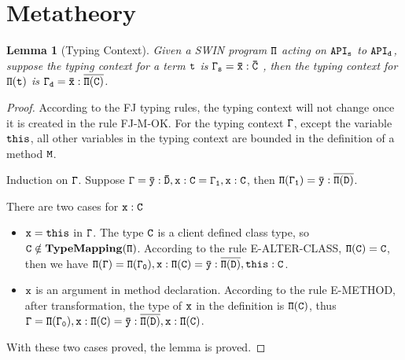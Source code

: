 \documentclass[letterpaper]{article}
\newtheorem{lemma}{Lemma}
\begin{document}
\section{Metatheory}
\begin{lemma}[Typing Context]
Given a SWIN program $\tt\Pi$ acting on $\tt API_s$ to $\tt API_d$, suppose the typing context for a term $\tt t$ is $\tt\Gamma_s = \bar{x}:\bar{C}$ , then the typing context for $\tt\Pi(t)$ is $\tt\Gamma_d=\bar{x}:\overline{\Pi(C)}$.
\end{lemma}
\begin{proof}
According to the FJ typing rules, the typing context will not change once it is created in the rule FJ-M-OK. For the typing context $\tt\Gamma$, except the variable $\tt this$,  all other variables in the typing context are bounded in the definition of a method $\tt M$.

Induction on $\tt\Gamma$. Suppose $\tt\Gamma = \bar{y}:\bar{D}, x:C = \Gamma_1, x:C$, then $\tt\Pi(\Gamma_1)=\bar{y}:\overline{\Pi(D)}$.

There are two cases for $\tt x:C$
\begin{itemize}
\item $\tt x=this$ in $\tt\Gamma$. The type $\tt C$ is a client defined class type, so $\tt C\notin \mathbf{TypeMapping}(\Pi)$. According to the rule E-ALTER-CLASS, $\tt \Pi(C)=C$, then we have $\tt\Pi(\Gamma)=\Pi(\Gamma_0), x:\Pi(C) = \bar{y}:\overline{\Pi(D)}, this:C$.
\item $\tt x$ is an argument in method declaration. According to the rule E-METHOD, after transformation, the type of $\tt x$ in the definition is $\tt\Pi(C)$, thus $\tt\Gamma=\Pi(\Gamma_0), x:\Pi(C) = \bar{y}:\overline{\Pi(D)}, x:\Pi(C)$. 
\end{itemize}

With these two cases proved, the lemma is proved.
\end{proof}
\end{document}
